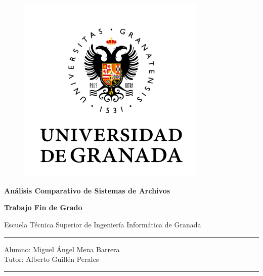\begin{titlepage}

	\begin{center}

		\vspace*{-3.5cm}

		\begin{figure}[htb]
		\begin{center}
		\includegraphics[width=9cm,keepaspectratio]{doc/assets/images/portada/urg.png}
		\end{center}
		\end{figure}


		\vspace*{0.9cm}
		\textbf{\huge{Análisis Comparativo de Sistemas de Archivos}}
		\vspace*{0.74cm}

		\large{\bfseries Trabajo Fin de Grado}
		\vspace*{0.74cm}


		\small{Escuela Técnica Superior de Ingeniería Informática de Granada } \\
			

		\vspace*{0.42cm}
		\rule{139mm}{0.15mm}
		\vspace*{0.42cm}


		\large{Alumno: Miguel Ángel Mena Barrera} \\
		\large{Tutor: Alberto Guillén Perales}
	
		\rule{139mm}{0.15mm}
		\vspace*{0.1cm}


\end{center}
\end{titlepage}
